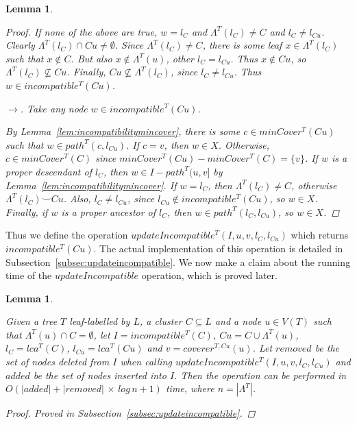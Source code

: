 \documentclass[12pt,a4paper]{article}
\newcommand{\compatible}{\smile}
\newcommand{\leafset}{\Lambda}
\newtheorem{updateincompatibleruntime}[incompatibility]{Lemma}
\newtheorem{incompatibilityrecursive}[incompatibility]{Lemma}
\begin{document}
\begin{incompatibilityrecursive}
\begin{proof}
            If none of the above are true, $w = l_C$ and $\leafset^{T}(l_C) \neq C$ and $l_C \neq l_{Cu}$. Clearly $\leafset^{T}(l_C) \cap Cu \neq \emptyset$. Since $\leafset^{T}(l_C) \neq C$, there is some leaf $x \in \leafset^{T}(l_C)$ such that $x \not\in C$. But also $x \not\in \leafset^{T}(u)$, other $l_C = l_{Cu}$. Thus $x \not\in Cu$, so $\leafset^{T}(l_C) \not\subseteq Cu$. Finally, $Cu \not\subseteq \leafset^{T}(l_C)$, since $l_C \neq l_{Cu}$. Thus $w \in incompatible^{T}(Cu)$.

            $\longrightarrow$. Take any node $w \in incompatible^{T}(Cu)$.

            By Lemma~\ref{lem:incompatibilitymincover}, there is some $c \in minCover^{T}(Cu)$ such that $w \in path^{T}(c, l_{Cu})$. If $c = v$, then $w \in X$. Otherwise, $c \in minCover^{T}(C)$ since $minCover^{T}(Cu) - minCover^{T}(C) = \{v\}$. If $w$ is a proper descendant of $l_C$, then $w \in I - path^{T}(u, v]$ by Lemma~\ref{lem:incompatibilitymincover}. If $w = l_C$, then $\leafset^{T}(l_C) \neq C$, otherwise $\leafset^{T}(l_C) \compatible Cu$. Also, $l_C \neq l_{Cu}$, since $l_{Cu} \not\in incompatible^{T}(Cu)$, so $w \in X$. Finally, if $w$ is a proper ancestor of $l_C$, then $w \in path^{T}(l_C, l_{Cu})$, so $w \in X$.
        \end{proof}
    \end{incompatibilityrecursive}

    Thus we define the operation $updateIncompatible^{T}(I, u, v, l_C, l_{Cu})$ which returns $incompatible^{T}(Cu)$. The actual implementation of this operation is detailed in Subsection~\ref{subsec:updateincompatible}. We now make a claim about the running time of the $updateIncompatible$ operation, which is proved later.
    \newline

    \begin{updateincompatibleruntime}
        \label{lem:updateincompatibleruntime}

        Given a tree $T$ leaf-labelled by $L$, a cluster $C \subseteq L$ and a node $u \in V(T)$ such that $\leafset^{T}(u) \cap C = \emptyset$, let $I = incompatible^{T}(C)$, $Cu = C \cup \leafset^{T}(u)$, $l_C = lca^{T}(C)$, $l_{Cu} = lca^{T}(Cu)$ and $v = coverer^{T, Cu}(u)$. Let $removed$ be the set of nodes deleted from $I$ when calling $updateIncompatible^{T}(I, u, v, l_C, l_{Cu})$ and $added$ be the set of nodes inserted into $I$. Then the operation can be performed in $O(|added| + |removed|\,\times\,log\,n + 1)$ time, where $n = |\leafset^{T}|$.

        \begin{proof}
            Proved in Subsection~\ref{subsec:updateincompatible}.
        \end{proof}
    \end{updateincompatibleruntime}
\end{document}
